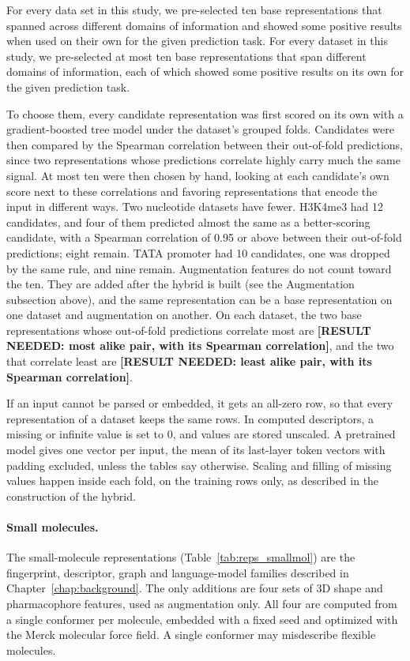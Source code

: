 For every data set in this study, we pre-selected ten base representations that spanned across different domains of information and showed some positive results when used on their own for the given prediction task.
For every dataset in this study, we pre-selected at most ten base representations that span different domains of information, each of which showed some positive results on its own for the given prediction task.

To choose them, every candidate representation was first scored on its own with a gradient-boosted tree model \citep{ke2017lightgbm} under the dataset's grouped folds. Candidates were then compared by the Spearman correlation between their out-of-fold predictions, since two representations whose predictions correlate highly carry much the same signal. At most ten were then chosen by hand, looking at each candidate's own score next to these correlations and favoring representations that encode the input in different ways. Two nucleotide datasets have fewer. H3K4me3 had 12 candidates, and four of them predicted almost the same as a better-scoring candidate, with a Spearman correlation of 0.95 or above between their out-of-fold predictions; eight remain. TATA promoter had 10 candidates, one was dropped by the same rule, and nine remain. Augmentation features do not count toward the ten. They are added after the hybrid is built (see the Augmentation subsection above), and the same representation can be a base representation on one dataset and augmentation on another.
On each dataset, the two base representations whose out-of-fold predictions correlate most are \textbf{[RESULT NEEDED: most alike pair, with its Spearman correlation]}, and the two that correlate least are \textbf{[RESULT NEEDED: least alike pair, with its Spearman correlation]}.

If an input cannot be parsed or embedded, it gets an all-zero row, so that every representation of a dataset keeps the same rows. In computed descriptors, a missing or infinite value is set to 0, and values are stored unscaled. A pretrained model gives one vector per input, the mean of its last-layer token vectors with padding excluded, unless the tables say otherwise. Scaling and filling of missing values happen inside each fold, on the training rows only, as described in the construction of the hybrid.

\paragraph{Small molecules.} The small-molecule representations (Table~\ref{tab:reps_smallmol}) are the fingerprint, descriptor, graph and language-model families described in Chapter~\ref{chap:background}. The only additions are four sets of 3D shape and pharmacophore features, used as augmentation only. All four are computed from a single conformer per molecule, embedded with a fixed seed and optimized with the Merck molecular force field. A single conformer may misdescribe flexible molecules.

